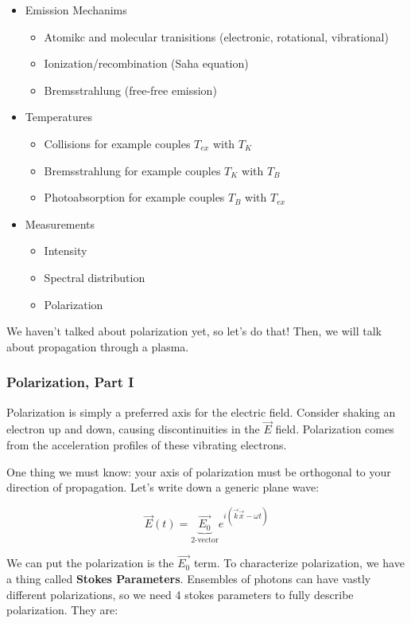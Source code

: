 \documentclass{article}
\def\Efield{{\vec {E}}}
\begin{document}
\begin{itemize}
    \item Emission Mechanims
    \begin{itemize}
        \item Atomikc and molecular tranisitions (electronic, rotational, vibrational)
        \item Ionization/recombination (Saha equation)
        \item Bremsstrahlung (free-free emission)
    \end{itemize}
    \item Temperatures
    \begin{itemize}
        \item Collisions for example couples $T_{ex}$ with $T_K$
        \item Bremsstrahlung for example couples $T_K$ with $T_B$
        \item Photoabsorption for example couples $T_B$ with $T_{ex}$
    \end{itemize}
    \item Measurements
    \begin{itemize}
        \item Intensity
        \item Spectral distribution
        \item Polarization
    \end{itemize}
\end{itemize}

We haven't talked about polarization yet, so let's do that! Then, we will talk about propagation through a plasma.

\subsubsection{Polarization, Part I}

Polarization is simply a preferred axis for the electric field. Consider shaking an electron up and down, causing discontinuities in the $\Efield$ field. Polarization comes from the acceleration profiles of these vibrating electrons.

One thing we must know: your axis of polarization must be orthogonal to your direction of propagation. Let's write down a generic plane wave:

$$
\Efield(t) = \underbrace{\vec{E_0}}_\text{2-vector} e^{i(\vec{k}\dot \vec{x} - \omega t)}
$$

We can put the polarization is the $\vec{E_0}$ term. To characterize polarization, we have a thing called \textbf{Stokes Parameters}. Ensembles of photons can have vastly different polarizations, so we need 4 stokes parameters to fully describe polarization. They are:
\end{document}
